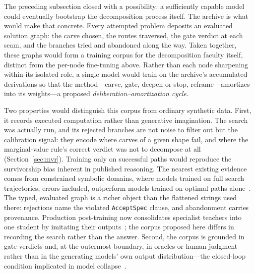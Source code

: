 \documentclass[11pt]{article}
\let\oldtexttt\texttt
\renewcommand{\texttt}[1]{\oldtexttt{\small #1}}
\begin{document}
The preceding subsection closed with a possibility: a sufficiently capable
model could eventually bootstrap the decomposition process itself. The
archive is what would make that concrete. Every attempted problem deposits an
evaluated solution graph: the carve chosen, the routes traversed, the gate
verdict at each seam, and the branches tried and abandoned along the way.
Taken together, these graphs would form a training corpus for the
decomposition faculty itself, distinct from the per-node fine-tuning above.
Rather than each node sharpening within its isolated role, a single model
would train on the archive's accumulated derivations so that the
method---carve, gate, deepen or stop, reframe---amortizes into its
weights---a proposed \emph{deliberation--amortization cycle}.

Two properties would distinguish this corpus from ordinary synthetic data.
First, it records executed computation rather than generative imagination.
The search was actually run, and its rejected branches are not noise to
filter out but the calibration signal: they encode where carves of a given
shape fail, and where the marginal-value rule's correct verdict was not to
decompose at all (Section~\ref{sec:mvr}). Training only on successful paths
would reproduce the survivorship bias inherent in published reasoning. The
nearest existing evidence comes from constrained symbolic domains, where
models trained on full search trajectories, errors included, outperform
models trained on optimal paths alone~\cite{gandhi2024sos}. The typed,
evaluated graph is a richer object than the flattened strings used there:
rejections name the violated \texttt{AcceptSpec} clause, and abandonment
carries provenance. Production post-training now consolidates specialist
teachers into one student by imitating their outputs~\cite{deepseek2026v4};
the corpus proposed here differs in recording the search rather than the
answer. Second, the corpus is grounded in gate verdicts and, at
the outermost boundary, in oracles or human judgment rather than in the
generating models' own output distribution---the closed-loop condition
implicated in model collapse~\cite{shumailov2023curse}.
\end{document}
